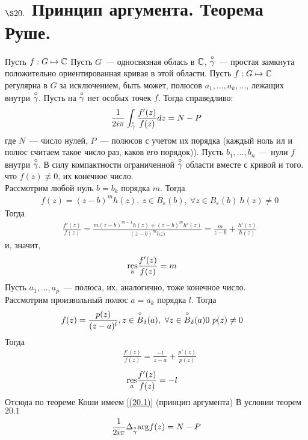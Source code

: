 \section{$\S 20.$ Принцип аргумента. Теорема Руше.}
\theorem
Пусть $f: G \mapsto \mathbb{C}$
Пусть $G$~--- односвязная облась в $\mathbb{C}$, $\overset{\circ}{\gamma}$~--- простая замкнута
положительно ориентированная кривая в этой области. Пусть $f: G \mapsto \mathbb{C}$
регулярна в $G$ за исключением, быть может, полюсов $a_1, \dots, a_k, \dots$,
лежащих внутри $\overset{\circ}{\gamma}$. Пусть на $\overset{\circ}{\gamma}$ нет особых точек $f$. Тогда
справедливо:
\begin{equation}\label{(20.1)}
    \frac{1}{2 i \pi}\int_{\overset{\circ}{\gamma}} \frac{f'(z)}{f(z)}dz = N - P
\end{equation}
где $N$~--- число нулей, $P$~--- полюсов с учетом их порядка (каждый ноль ил и
полюс считаем такое число раз, каков его порядок)).
\pr
Пусть $b_1, \dots, b_n$~--- нули $f$ внутри $\overset{\circ}{\gamma}$. В силу компактности
ограниченной $\overset{\circ}{\gamma}$ области вместе с кривой и того. что $f(z) \not \equiv 0$,
их конечное число.
\\
Рассмотрим любой нуль $b = b_k$ порядка $m$. Тогда
\begin{align*}
  & f(z) = (z-b)^mh(z), \ z \in B_\varepsilon(b), \ \forall z \in B_\varepsilon(b) \ h(z) \neq 0
\end{align*}
Тогда
\begin{align*}
  & \frac{f'(z)}{f(z)} = \frac{m(z-b)^{m-1}h(z)+(z-b)^mh'(z)}{(z-b)^mhz)} = \frac{m}{z-b} + \frac{h'(z)}{h(z)}
\end{align*}
и, значит,
\begin{align*}
  & \underset{b}{\mathrm{res}}\frac{f'(z)}{f(z)} = m
\end{align*}
Пусть $a_1, \dots, a_p$~--- полюса, их, аналогично, тоже конечное число.
\\
Рассмотрим произвольный полюс $a = a_k$ порядка $l$. Тогда
\begin{align*}
& f(z) = \frac{p(z)}{(z-a)^l}, z \in \os{\circ}{B}_\delta(a), \ \forall z \in \os{\circ}{B}_\delta
(a)0 \ p(z)\neq 0
\end{align*}
Тогда
\begin{align*}
  & \frac{f'(z)}{f(z)} = \frac{-l}{z-a} + \frac{p'(z)}{p(z)}
\end{align*}
\begin{align*}
  & \underset{a}{\mathrm{res}}\frac{f'(z)}{f(z)} = -l
\end{align*}
Отсюда по теореме Коши имеем \eqref{(20.1)}
\corollary (принцип аргумента)
В условии теорем $20.1$
\begin{equation}\label{(20.2)}
  \frac{1}{2 i \pi} \Delta_{\overset{\circ}{\gamma}}\mathrm{arg} f(z) = N - P
\end{equation}
